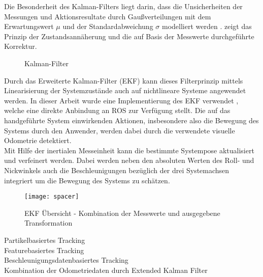 Die Besonderheit des Kalman-Filters liegt darin, dass die Unsicherheiten der Messungen und Aktionsresultate durch Gaußverteilungen mit dem Erwartungswert $\mu$ und der Standardabweichung $\sigma$ modelliert werden \cite{Hertzberg2012}.  zeigt das Prinzip der Zustandsannäherung und die auf Basis der Messwerte durchgeführte Korrektur. \red[Beschreibuns!]\\

\begin{figure}[ht]
	\begin{center}%
		\caption{Kalman-Filter}
		\label{fig.kalman}
	\end{center}
\end{figure}

Durch das Erweiterte Kalman-Filter (EKF) kann dieses Filterprinzip mittels Linearisierung der Systemzustände auch auf nichtlineare Systeme angewendet werden. In dieser Arbeit wurde eine Implementierung des EKF verwendet \cite{EKF}, welche eine direkte Anbindung an ROS zur Verfügung stellt. Die auf das handgeführte System einwirkenden Aktionen, insbesondere also die Bewegung des Systems durch den Anwender, werden dabei durch die verwendete visuelle Odometrie detektiert.\\
Mit Hilfe der inertialen Messeinheit kann die bestimmte Systempose aktualisiert und verfeinert werden. Dabei werden neben den absoluten Werten des Roll- und Nickwinkels auch die Beschleunigungen bezüglich der drei Systemachsen integriert um die Bewegung des Systems zu schätzen.\\

\begin{figure}[!ht]
	\begin{center}
		\texttt{[image: spacer]}
		\caption{EKF Übersicht - Kombination der Messwerte und ausgegebene Transformation}
		\label{fig.ekf}
	\end{center}
\end{figure}


Partikelbasiertes Tracking\\
Featurebasiertes Tracking\\
Beschleunigungsdatenbasiertes Tracking\\
Kombination der Odometriedaten durch Extended Kalman Filter \\
